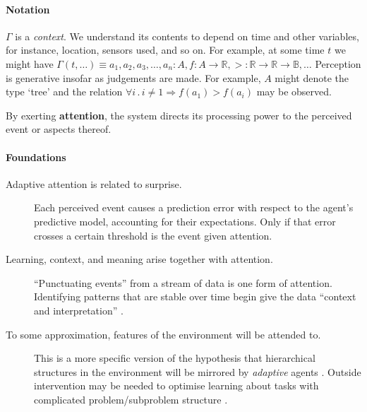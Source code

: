 \paragraph{\textbf{\upshape Notation}}

$\Gamma$ is a \emph{context}.  We understand its contents to depend on
time and other variables, for instance, location, sensors used, and so
on.  For example, at some time $t$ we might have $\Gamma(t,\ldots)
\equiv a_1, a_2, a_3, \ldots, a_n : A, f:A\rightarrow \mathbb{R},
>:\mathbb{R}\rightarrow\mathbb{R}\rightarrow \mathbb{B}, \ldots$
Perception is generative insofar as judgements are made.  For example,
$A$ might denote the type `tree' and the relation $\forall i
\mathbin{.} i\neq 1 \Rightarrow f(a_1)>f(a_i)$ may be observed.


\begin{defn}\label{def:attention}
\hypertarget{def:attention}{}By exerting \textbf{attention}, the system directs its processing power to the perceived event or aspects thereof.
\end{defn}

\paragraph{\textbf{\upshape Foundations}}

\begin{description}
\item[Adaptive attention is related to surprise.] Each perceived event causes a prediction error with respect to the agent's predictive model, accounting for their expectations. Only if that error crosses a certain threshold is the event given attention.
\item[Learning, context, and meaning arise together with attention.]
  ``Punctuating events'' \cite[p.~301]{bateson-logical-categories}
  from a stream of data is one form of attention.  Identifying
  patterns that are stable over time begin give the data
  ``context and interpretation'' \cite{rowley2007wisdom}.
\item[To some approximation, features of the environment will be attended to.] This is a more specific version of the hypothesis
  that hierarchical structures in the environment will be mirrored by
  \emph{adaptive} agents \cite{simon1962architecture,simon1995near}.
  Outside intervention may be needed to optimise learning about tasks
  with complicated problem/subproblem structure
  \cite{goldenberg2004may}.
\end{description}

